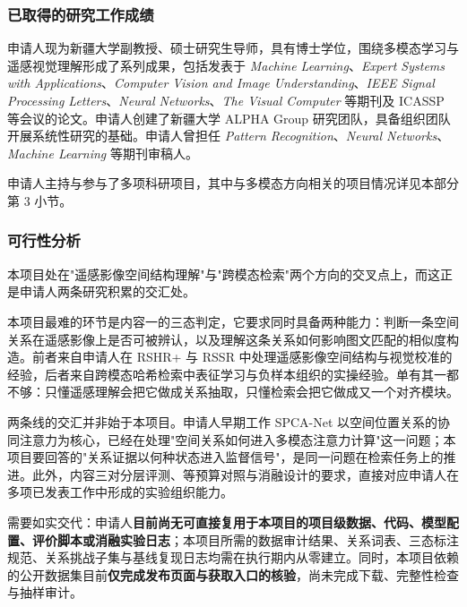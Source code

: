 \subsubsection{已取得的研究工作成绩}

申请人现为新疆大学副教授、硕士研究生导师，具有博士学位，围绕多模态学习与遥感视觉理解形成了系列成果，包括发表于 \textit{Machine Learning}、\textit{Expert Systems with Applications}、\textit{Computer Vision and Image Understanding}、\textit{IEEE Signal Processing Letters}、\textit{Neural Networks}、\textit{The Visual Computer} 等期刊及 ICASSP 等会议的论文。申请人创建了新疆大学 ALPHA Group 研究团队，具备组织团队开展系统性研究的基础。申请人曾担任 \textit{Pattern Recognition}、\textit{Neural Networks}、\textit{Machine Learning} 等期刊审稿人。

申请人主持与参与了多项科研项目，其中与多模态方向相关的项目情况详见本部分第 3 小节。

\subsubsection{可行性分析}


本项目处在"遥感影像空间结构理解"与"跨模态检索"两个方向的交叉点上，而这正是申请人两条研究积累的交汇处。

本项目最难的环节是内容一的三态判定，它要求同时具备两种能力：判断一条空间关系在遥感影像上是否可被辨认，以及理解这条关系如何影响图文匹配的相似度构造。前者来自申请人在 RSHR+ 与 RSSR 中处理遥感影像空间结构与视觉校准的经验，后者来自跨模态哈希检索中表征学习与负样本组织的实操经验。单有其一都不够：只懂遥感理解会把它做成关系抽取，只懂检索会把它做成又一个对齐模块。

两条线的交汇并非始于本项目。申请人早期工作 SPCA-Net 以空间位置关系的协同注意力为核心，已经在处理"空间关系如何进入多模态注意力计算"这一问题；本项目要回答的"关系证据以何种状态进入监督信号"，是同一问题在检索任务上的推进。此外，内容三对分层评测、等预算对照与消融设计的要求，直接对应申请人在多项已发表工作中形成的实验组织能力。


需要如实交代：申请人\textbf{目前尚无可直接复用于本项目的项目级数据、代码、模型配置、评价脚本或消融实验日志}；本项目所需的数据审计结果、关系词表、三态标注规范、关系挑战子集与基线复现日志均需在执行期内从零建立。同时，本项目依赖的公开数据集目前\textbf{仅完成发布页面与获取入口的核验}，尚未完成下载、完整性检查与抽样审计。


